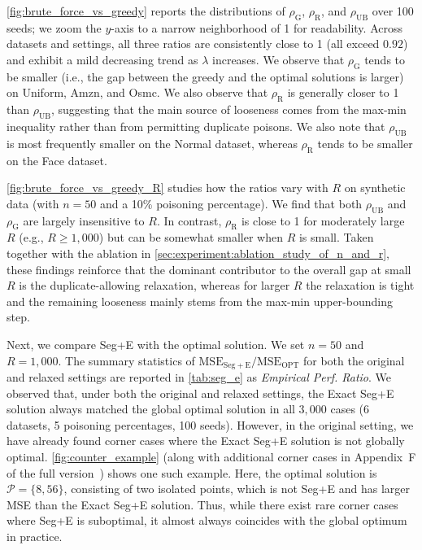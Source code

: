 \documentclass[acmsmall]{acmart}
\begin{document}
\cref{fig:brute_force_vs_greedy} reports the distributions of $\rho_\mathrm{G}$, $\rho_\mathrm{R}$, and $\rho_\mathrm{UB}$ over 100 seeds;
we zoom the $y$-axis to a narrow neighborhood of 1 for readability.
Across datasets and settings, all three ratios are consistently close to 1 (all exceed $0.92$) and exhibit a mild decreasing trend as $\lambda$ increases.
We observe that $\rho_\mathrm{G}$ tends to be smaller (i.e., the gap between the greedy and the optimal solutions is larger) on Uniform, Amzn, and Osmc.
We also observe that $\rho_\mathrm{R}$ is generally closer to 1 than $\rho_\mathrm{UB}$, suggesting that the main source of looseness comes from the max-min inequality rather than from permitting duplicate poisons.
We also note that $\rho_\mathrm{UB}$ is most frequently smaller on the Normal dataset, whereas $\rho_\mathrm{R}$ tends to be smaller on the Face dataset.

\cref{fig:brute_force_vs_greedy_R} studies how the ratios vary with $R$ on synthetic data (with $n=50$ and a 10\% poisoning percentage).
We find that both $\rho_\mathrm{UB}$ and $\rho_\mathrm{G}$ are largely insensitive to $R$.
In contrast, $\rho_\mathrm{R}$ is close to 1 for moderately large $R$ (e.g., $R\ge 1{,}000$) but can be somewhat smaller when $R$ is small.
Taken together with the ablation in \cref{sec:experiment:ablation_study_of_n_and_r}, these findings reinforce that the dominant contributor to the overall gap at small $R$ is the duplicate-allowing relaxation, whereas for larger $R$ the relaxation is tight and the remaining looseness mainly stems from the max-min upper-bounding step.

Next, we compare Seg+E with the optimal solution.
We set $n=50$ and $R=1{,}000$.
The summary statistics of $\mathrm{MSE}_\mathrm{Seg+E}/\mathrm{MSE}_\mathrm{OPT}$ for both the original and relaxed settings are reported in \cref{tab:seg_e} as \textit{Empirical Perf. Ratio}.
We observed that, under both the original and relaxed settings, the Exact Seg+E solution always matched the global optimal solution in all $3{,}000$ cases (6 datasets, 5 poisoning percentages, 100 seeds).
However, in the original setting, we have already found corner cases where the Exact Seg+E solution is not globally optimal.
\cref{fig:counter_example} (along with additional corner cases in Appendix~F of the full version~\cite{sato2026mathematical_arxiv}) shows one such example.
Here, the optimal solution is $\mathcal{P}=\{8,56\}$, consisting of two isolated points, which is not Seg+E and has larger MSE than the Exact Seg+E solution.
Thus, while there exist rare corner cases where Seg+E is suboptimal, it almost always coincides with the global optimum in practice.
\end{document}
